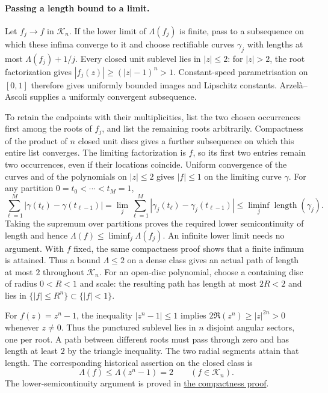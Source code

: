 \paragraph{Passing a length bound to a limit.}
Let $f_j\to f$ in $\mathcal K_n$. If the lower limit of
$\Lambda(f_j)$ is finite, pass to a subsequence on which these infima
converge to it and choose rectifiable curves $\gamma_j$ with lengths at
most $\Lambda(f_j)+1/j$. Every closed unit sublevel lies in $|z|\le2$:
for $|z|>2$, the root factorization gives
$|f_j(z)|\ge(|z|-1)^n>1$. Constant-speed parametrisation on $[0,1]$
therefore gives uniformly bounded images and Lipschitz constants.
Arzel\`a--Ascoli supplies a uniformly convergent subsequence.

To retain the endpoints with their multiplicities, list the two chosen
occurrences first among the roots of $f_j$, and list the remaining roots
arbitrarily. Compactness of the product of $n$ closed unit discs gives a
further subsequence on which this entire list converges. The limiting
factorization is $f$, so its first two entries remain two occurrences,
even if their locations coincide. Uniform convergence of the curves and
of the polynomials on $|z|\le2$ gives $|f|\le1$ on the limiting curve
$\gamma$. For any partition $0=t_0<\cdots<t_M=1$,
\[
 \sum_{\ell=1}^M|\gamma(t_\ell)-\gamma(t_{\ell-1})|
 =\lim_j\sum_{\ell=1}^M|\gamma_j(t_\ell)-\gamma_j(t_{\ell-1})|
 \le\liminf_j\operatorname{length}(\gamma_j).
\]
Taking the supremum over partitions proves the required lower
semicontinuity of length and hence
$\Lambda(f)\le\liminf_j\Lambda(f_j)$. An infinite lower limit needs no
argument. With $f$ fixed, the same compactness proof shows that a finite
infimum is attained. Thus a bound $\Lambda\le2$ on a dense class gives
an actual path of length at most $2$ throughout $\mathcal K_n$.
For an open-disc polynomial, choose a containing disc of radius
$0<R<1$ and scale: the resulting path has length at most $2R<2$ and
lies in $\{|f|\le R^n\}\subset\{|f|<1\}$.

For $f(z)=z^n-1$, the inequality $|z^n-1|\le1$ implies
$2\Re(z^n)\ge|z|^{2n}>0$ whenever $z\ne0$. Thus the punctured sublevel
lies in $n$ disjoint angular sectors, one per root. A path between
different roots must pass through zero and has length at least $2$ by
the triangle inequality. The two radial segments attain that length.  The corresponding historical assertion on the closed class is
\[
 \boxed{\Lambda(f)\le\Lambda(z^n-1)=2\qquad(f\in\mathcal K_n).}
\]
The lower-semicontinuity argument is proved in
\href{https://github.com/wcook04/plectis-erdos/blob/f36a98bf3d3e6f65f1074e3b800e3293d5b8a51a/ErdosProblems/Erdos1041/GenericSufficiencyClosure.md}{the compactness proof}.

